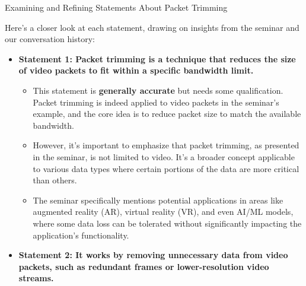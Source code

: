 \documentclass[
]{article}
\author{}
\date{}
\begin{document}
{Examining and Refining Statements About Packet
Trimming}\label{examining-and-refining-statements-about-packet-trimming}

Here's a closer look at each statement, drawing on insights from the
seminar and our conversation history:

\begin{itemize}
\item
  \textbf{Statement 1: Packet trimming is a technique that reduces the
  size of video packets to fit within a specific bandwidth limit.}

  \begin{itemize}
  
  \item
    This statement is \textbf{generally accurate} but needs some
    qualification. Packet trimming is indeed applied to video packets in
    the seminar's example, and the core idea is to reduce packet size to
    match the available bandwidth.
  \item
    However, it's important to emphasize that packet trimming, as
    presented in the seminar, is not limited to video. It's a broader
    concept applicable to various data types where certain portions of
    the data are more critical than others.
  \item
    The seminar specifically mentions potential applications in areas
    like augmented reality (AR), virtual reality (VR), and even AI/ML
    models, where some data loss can be tolerated without significantly
    impacting the application's functionality.
  \end{itemize}
\item
  \textbf{Statement 2: It works by removing unnecessary data from video
  packets, such as redundant frames or lower-resolution video streams.}

  \begin{itemize}
  

\end{itemize}
\end{itemize}
\end{document}
